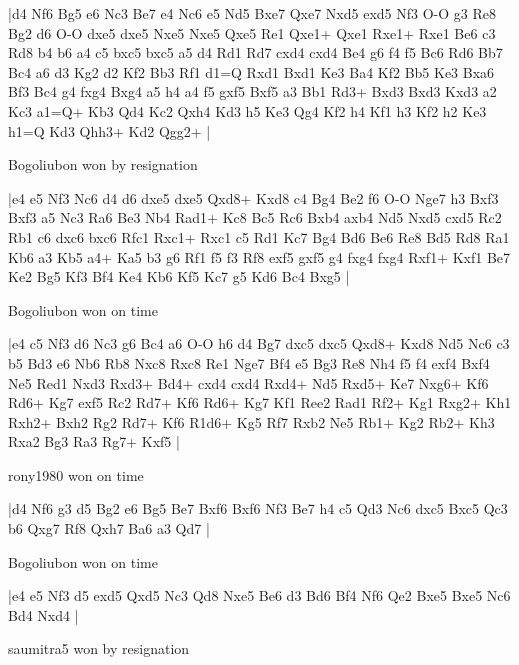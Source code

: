\makegametitle
|d4 Nf6 Bg5 e6 Nc3 Be7 e4 Nc6 e5 Nd5 Bxe7 Qxe7 Nxd5 exd5 Nf3 O-O g3 Re8 Bg2 d6 O-O dxe5 dxe5 Nxe5 Nxe5 Qxe5 Re1 Qxe1+ Qxe1 Rxe1+ Rxe1 Be6 c3 Rd8 b4 b6 a4 c5 bxc5 bxc5 a5 d4 Rd1 Rd7 cxd4 cxd4 Be4 g6 f4 f5 Bc6 Rd6 Bb7 Bc4 a6 d3 Kg2 d2 Kf2 Bb3 Rf1 d1=Q Rxd1 Bxd1 Ke3 Ba4 Kf2 Bb5 Ke3 Bxa6 Bf3 Bc4 g4 fxg4 Bxg4 a5 h4 a4 f5 gxf5 Bxf5 a3 Bb1 Rd3+ Bxd3 Bxd3 Kxd3 a2 Kc3 a1=Q+ Kb3 Qd4 Kc2 Qxh4 Kd3 h5 Ke3 Qg4 Kf2 h4 Kf1 h3 Kf2 h2 Ke3 h1=Q Kd3 Qhh3+ Kd2 Qgg2+  |

\showboard

Bogoliubon won by resignation

\makegametitle
|e4 e5 Nf3 Nc6 d4 d6 dxe5 dxe5 Qxd8+ Kxd8 c4 Bg4 Be2 f6 O-O Nge7 h3 Bxf3 Bxf3 a5 Nc3 Ra6 Be3 Nb4 Rad1+ Kc8 Bc5 Rc6 Bxb4 axb4 Nd5 Nxd5 cxd5 Rc2 Rb1 c6 dxc6 bxc6 Rfc1 Rxc1+ Rxc1 c5 Rd1 Kc7 Bg4 Bd6 Be6 Re8 Bd5 Rd8 Ra1 Kb6 a3 Kb5 a4+ Ka5 b3 g6 Rf1 f5 f3 Rf8 exf5 gxf5 g4 fxg4 fxg4 Rxf1+ Kxf1 Be7 Ke2 Bg5 Kf3 Bf4 Ke4 Kb6 Kf5 Kc7 g5 Kd6 Bc4 Bxg5  |

\showboard

Bogoliubon won on time

\makegametitle
|e4 c5 Nf3 d6 Nc3 g6 Bc4 a6 O-O h6 d4 Bg7 dxc5 dxc5 Qxd8+ Kxd8 Nd5 Nc6 c3 b5 Bd3 e6 Nb6 Rb8 Nxc8 Rxc8 Re1 Nge7 Bf4 e5 Bg3 Re8 Nh4 f5 f4 exf4 Bxf4 Ne5 Red1 Nxd3 Rxd3+ Bd4+ cxd4 cxd4 Rxd4+ Nd5 Rxd5+ Ke7 Nxg6+ Kf6 Rd6+ Kg7 exf5 Rc2 Rd7+ Kf6 Rd6+ Kg7 Kf1 Ree2 Rad1 Rf2+ Kg1 Rxg2+ Kh1 Rxh2+ Bxh2 Rg2 Rd7+ Kf6 R1d6+ Kg5 Rf7 Rxb2 Ne5 Rb1+ Kg2 Rb2+ Kh3 Rxa2 Bg3 Ra3 Rg7+ Kxf5  |

\showboard

rony1980 won on time

\makegametitle
|d4 Nf6 g3 d5 Bg2 e6 Bg5 Be7 Bxf6 Bxf6 Nf3 Be7 h4 c5 Qd3 Nc6 dxc5 Bxc5 Qc3 b6 Qxg7 Rf8 Qxh7 Ba6 a3 Qd7  |

\showboard

Bogoliubon won on time

\makegametitle
|e4 e5 Nf3 d5 exd5 Qxd5 Nc3 Qd8 Nxe5 Be6 d3 Bd6 Bf4 Nf6 Qe2 Bxe5 Bxe5 Nc6 Bd4 Nxd4  |

\showboard

saumitra5 won by resignation

